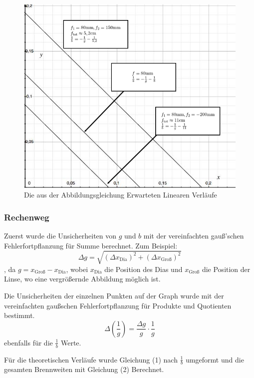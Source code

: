 \documentclass[11pt,a4paper]{article}
\begin{document}
\begin{figure}
	\centering
	\includegraphics[scale=0.5]{Abb3}
	\caption{ Die aus der Abbildungsgleichung Erwarteten Linearen Verläufe}
\end{figure} 

\begin{tcolorbox}[colback=white]
\subsubsection{Rechenweg}
Zuerst wurde die Unsicherheiten von $g$ und $b$ mit der vereinfachten gauß'schen Fehlerfortpflanzung für Summe berechnet. Zum Beispiel:
$$ \Delta g = \sqrt{(\Delta x_\textrm{Dia})^2 + (\Delta x_\textrm{Groß})^2}$$
, da $g = x_\textrm{Groß} - x_\textrm{Dia}$, wobei $x_\textrm{Dia}$ die Position des Dias und $x_\textrm{Groß}$ die Position der Linse, wo eine vergrößernde Abbildung möglich ist. 

Die Unsicherheiten der einzelnen Punkten auf der Graph wurde mit der vereinfachten gaußschen Fehlerfortpflanzung für Produkte und Quotienten bestimmt.
$$ \Delta\left(\frac{1}{g}\right) = \frac{\Delta g}{g} \cdot \frac{1}{g}$$
ebenfalls für die $\frac{1}{b}$ Werte. 
	
Für die theoretischen Verläufe wurde Gleichung (1) nach $\frac{1}{b}$ umgeformt und die gesamten Brennweiten mit Gleichung (2) Berechnet. 
	
	
\end{tcolorbox}
\end{document}
